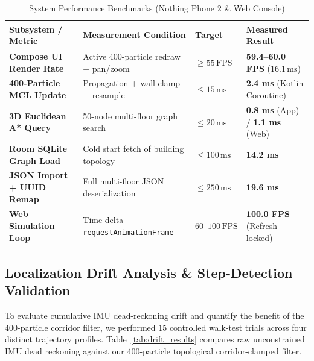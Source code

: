 \documentclass[11pt,a4paper]{article}
\begin{document}
\begin{table}[h!]
\centering
\caption{System Performance Benchmarks (Nothing Phone 2 \& Web Console)}
\label{tab:perf_benchmarks}
\renewcommand{\arraystretch}{1.25}
\footnotesize
\begin{tabularx}{\textwidth}{L{4.0cm} Y C{2.3cm} L{3.6cm}}
\toprule
\textbf{Subsystem / Metric} & \textbf{Measurement Condition} & \textbf{Target} & \textbf{Measured Result} \\
\midrule
\textbf{Compose UI Render Rate} & Active 400-particle redraw + pan/zoom & $\ge 55\,\text{FPS}$ & \textbf{59.4--60.0 FPS} ($16.1\,\text{ms}$) \\
\textbf{400-Particle MCL Update} & Propagation + wall clamp + resample & $\le 15\,\text{ms}$ & \textbf{2.4 ms} (Kotlin Coroutine) \\
\textbf{3D Euclidean A* Query} & 50-node multi-floor graph search & $\le 20\,\text{ms}$ & \textbf{0.8 ms} (App) / \textbf{1.1 ms} (Web) \\
\textbf{Room SQLite Graph Load} & Cold start fetch of building topology & $\le 100\,\text{ms}$ & \textbf{14.2 ms} \\
\textbf{JSON Import + UUID Remap} & Full multi-floor JSON deserialization & $\le 250\,\text{ms}$ & \textbf{19.6 ms} \\
\textbf{Web Simulation Loop} & Time-delta \texttt{requestAnimationFrame} & $60\text{--}100\,\text{FPS}$ & \textbf{100.0 FPS} (Refresh locked) \\
\bottomrule
\end{tabularx}
\end{table}

\subsection{Localization Drift Analysis \& Step-Detection Validation}
To evaluate cumulative IMU dead-reckoning drift and quantify the benefit of the 400-particle corridor filter, we performed $15$ controlled walk-test trials across four distinct trajectory profiles. Table~\ref{tab:drift_results} compares raw unconstrained IMU dead reckoning against our 400-particle topological corridor-clamped filter.
\end{document}
